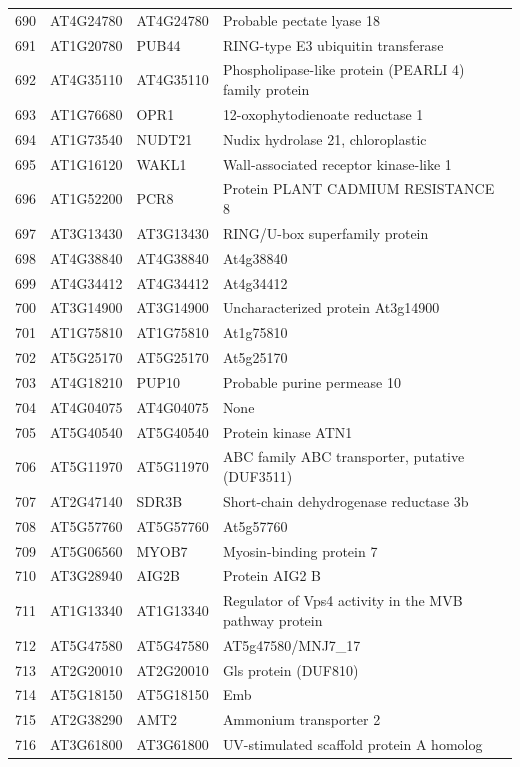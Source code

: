 \documentclass[11pt]{article}
\begin{document}
\begin{center}
\begin{tabular}{rlll}
690 & AT4G24780 & AT4G24780 & Probable pectate lyase 18\\
691 & AT1G20780 & PUB44 & RING-type E3 ubiquitin transferase\\
692 & AT4G35110 & AT4G35110 & Phospholipase-like protein (PEARLI 4) family protein\\
693 & AT1G76680 & OPR1 & 12-oxophytodienoate reductase 1\\
694 & AT1G73540 & NUDT21 & Nudix hydrolase 21, chloroplastic\\
695 & AT1G16120 & WAKL1 & Wall-associated receptor kinase-like 1\\
696 & AT1G52200 & PCR8 & Protein PLANT CADMIUM RESISTANCE 8\\
697 & AT3G13430 & AT3G13430 & RING/U-box superfamily protein\\
698 & AT4G38840 & AT4G38840 & At4g38840\\
699 & AT4G34412 & AT4G34412 & At4g34412\\
700 & AT3G14900 & AT3G14900 & Uncharacterized protein At3g14900\\
701 & AT1G75810 & AT1G75810 & At1g75810\\
702 & AT5G25170 & AT5G25170 & At5g25170\\
703 & AT4G18210 & PUP10 & Probable purine permease 10\\
704 & AT4G04075 & AT4G04075 & None\\
705 & AT5G40540 & AT5G40540 & Protein kinase ATN1\\
706 & AT5G11970 & AT5G11970 & ABC family ABC transporter, putative (DUF3511)\\
707 & AT2G47140 & SDR3B & Short-chain dehydrogenase reductase 3b\\
708 & AT5G57760 & AT5G57760 & At5g57760\\
709 & AT5G06560 & MYOB7 & Myosin-binding protein 7\\
710 & AT3G28940 & AIG2B & Protein AIG2 B\\
711 & AT1G13340 & AT1G13340 & Regulator of Vps4 activity in the MVB pathway protein\\
712 & AT5G47580 & AT5G47580 & AT5g47580/MNJ7\_17\\
713 & AT2G20010 & AT2G20010 & Gls protein (DUF810)\\
714 & AT5G18150 & AT5G18150 & Emb\\
715 & AT2G38290 & AMT2 & Ammonium transporter 2\\
716 & AT3G61800 & AT3G61800 & UV-stimulated scaffold protein A homolog\\

\end{tabular}
\end{center}
\end{document}
